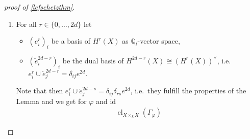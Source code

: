 \documentclass[english]{scrartcl}
\theoremstyle{definition}
\newtheorem{Lem}[Def]{Lemma}
\theoremstyle{remark}
\newcommand*{\Z}{\mathds{Z}}
\newcommand*{\Q}{\mathds{Q}}
\newcommand*{\Zl}{\Z_l} %
\newcommand*{\Ql}{\Q_l} %
\newcommand*{\End}[1]{\text{End}(#1)} %
\newcommand*{\id}{\text{id}} %
\newcommand*{\idest}{i.e.\ }
\newcommand*{\Tr}{\text{tr}} %
\newcommand*{\tr}[1]{\Tr\left(#1\right)} %
\newcommand*{\Graph}[1]{{\Gamma_{#1}}} %
\DeclareMathOperator{\CL}{cl} %
\newcommand*{\cl}[2]{{\CL_{#1}\left(#2\right)}} %
\newcommand*{\one}[1]{{1_{#1}}}%
\let\altphi\phi
\renewcommand*{\phi}{\varphi}
\begin{document}
\begin{proof}[proof of \autoref{lefschetzthm}]
\begin{enumerate}[label={Step \arabic*.}]
\begin{Lem}
      and $\altphi\in\End(X)$ regular.
      Write $e^{2d}\in H^{2d}(X)$ for the canonical generator
      with $\tr{e^{2d}}=1\in\Ql$.
      Furthermore, let $(b_k)_k$ be a basis of $H^*(X)$ as
      $\Ql$-vector space and $(f_k)_k$ be the dual Basis with respect
      to the cup product, \idest $b_k\cup f_l=\delta_{kl}e^{2d}$.
      Then
      \begin{gather*}
        \cl{X\times_k X}{\Graph{\phi}} =
        \sum_{k}^{2d} \phi^*(b_k)\otimes  f_k
      \end{gather*}
      \begin{proof}
        By the  %
        $H^*(X\otimes X) \cong H^*(X)\otimes_{\Ql}H^*(X)$ is a
        $H^*(X)$-module with basis
        $(\one{X}\otimes f_k)_{k}$.
        Therefore, there are unique factors $a_{k}$ in $H^*(X)$ s.t.
        \begin{gather}
          \label{eq:step2}
          \cl{X\times_k Y}{\Graph{\phi}} =
          \sum_{k} a_k\otimes f_k
        \end{gather}
        Explicitly
        \begin{align*}
          a_j
          = p_*(a_j\otimes e^{2d})
          &= p_*\Big(
            \sum_k(a_k\otimes f_k)\cup (\one{X}\otimes b_j)
            \Big)\\
          &\overset{\mathllap{\eqref{eq:step2}}}= p_*\left(
            \cl{X\times_k X}{\Graph{\phi}} \cup q^*(b_j)
            \right)\\
          &\overset{\mathllap{\ref{step1}}}= \phi^*(b_j) 
        \end{align*}
      \end{proof}
    \end{Lem}
  \item
    For all $r\in\{0,\dotsc,2d\}$ let
    \begin{itemize}
    \item $(e_i^r)_{i}$ be a basis of $H^r(X)$ as $\Ql$-vector space,
    \item $(\check e_i^{2d-r})_{i}$ be the dual basis of $H^{2d-r}(X)\cong (H^{r}(X))^\vee$,
      \idest $e^r_i\cup \check e_j^{2d-r}= \delta_{ij}e^{2d}$.
    \end{itemize}
    Note that then $e^r_i\cup \check e_j^{2d-s}=\delta_{ij}\delta_{rs}e^{2d}$,
    \idest they fulfill the properties of the Lemma
    and we get for $\phi$ and $\id$
    \begin{align*}
      \cl{X\times_k X}{\Graph{\phi}}

\end{align*}
\end{enumerate}
\end{proof}
\end{document}
